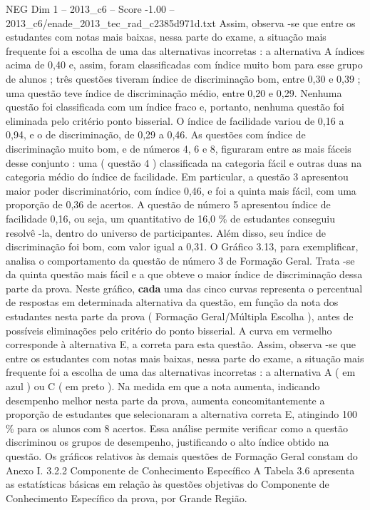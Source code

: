 \begin{textsample}{NEG Dim 1 – 2013\_c6 – Score -1.00 – 2013\_c6/enade\_2013\_tec\_rad\_c2385d971d.txt}
Assim, observa -se que entre os estudantes com notas mais baixas, nessa parte do exame, a situação mais frequente foi a escolha de uma das alternativas incorretas : a alternativa A índices acima de 0,40 e, assim, foram classificadas com índice muito bom para esse grupo de alunos ; três questões tiveram índice de discriminação bom, entre 0,30 e 0,39 ; uma questão teve índice de discriminação médio, entre 0,20 e 0,29.
Nenhuma questão foi classificada com um índice fraco e, portanto, nenhuma questão foi eliminada pelo critério ponto bisserial.
O índice de facilidade variou de 0,16 a 0,94, e o de discriminação, de 0,29 a 0,46.
As questões com índice de discriminação muito bom, e de números 4, 6 e 8, figuraram entre as mais fáceis desse conjunto : uma ( questão 4 ) classificada na categoria fácil e outras duas na categoria médio do índice de facilidade.
Em particular, a questão 3 apresentou maior poder discriminatório, com índice 0,46, e foi a quinta mais fácil, com uma proporção de 0,36 de acertos.
A questão de número 5 apresentou índice de facilidade 0,16, ou seja, um quantitativo de 16,0 \% de estudantes conseguiu resolvê -la, dentro do universo de participantes.
Além disso, seu índice de discriminação foi bom, com valor igual a 0,31.
O Gráfico 3.13, para exemplificar, analisa o comportamento da questão de número 3 de Formação Geral.
Trata -se da quinta questão mais fácil e a que obteve o maior índice de discriminação dessa parte da prova.
Neste gráfico, \textbf{cada} uma das cinco curvas representa o percentual de respostas em determinada alternativa da questão, em função da nota dos estudantes nesta parte da prova ( Formação Geral/Múltipla Escolha ), antes de possíveis eliminações pelo critério do ponto bisserial.
A curva em vermelho corresponde à alternativa E, a correta para esta questão.
Assim, observa -se que entre os estudantes com notas mais baixas, nessa parte do exame, a situação mais frequente foi a escolha de uma das alternativas incorretas : a alternativa A ( em azul ) ou C ( em preto ).
Na medida em que a nota aumenta, indicando desempenho melhor nesta parte da prova, aumenta concomitantemente a proporção de estudantes que selecionaram a alternativa correta E, atingindo 100 \% para os alunos com 8 acertos.
Essa análise permite verificar como a questão discriminou os grupos de desempenho, justificando o alto índice obtido na questão.
Os gráficos relativos às demais questões de Formação Geral constam do Anexo I. 3.2.2 Componente de Conhecimento Específico A Tabela 3.6 apresenta as estatísticas básicas em relação às questões objetivas do Componente de Conhecimento Específico da prova, por Grande Região.

\end{textsample}
